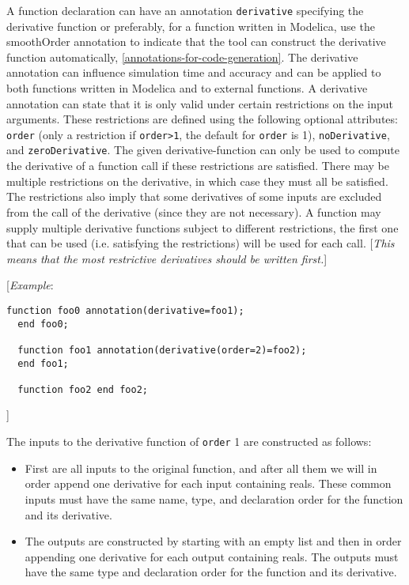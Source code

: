 A function declaration can have an annotation \lstinline!derivative! specifying the
derivative function or preferably, for a function written in Modelica,
use the smoothOrder annotation to indicate that the tool can construct
the derivative function automatically, \autoref{annotations-for-code-generation}. The derivative
annotation can influence simulation time and accuracy and can be applied
to both functions written in Modelica and to external functions. A
derivative annotation can state that it is only valid under certain
restrictions on the input arguments. These restrictions are defined
using the following optional attributes: \lstinline!order! (only a restriction if
\lstinline!order>1!, the default for \lstinline!order! is 1), \lstinline!noDerivative!, and
\lstinline!zeroDerivative!. The given derivative-function can only be used to
compute the derivative of a function call if these restrictions are
satisfied. There may be multiple restrictions on the derivative, in
which case they must all be satisfied. The restrictions also imply that
some derivatives of some inputs are excluded from the call of the
derivative (since they are not necessary). A function may supply
multiple derivative functions subject to different restrictions, the
first one that can be used (i.e. satisfying the restrictions) will be
used for each call. {[}\emph{This means that the most restrictive
derivatives should be written first.}{]}

{[}\emph{Example}:

\begin{lstlisting}[language=modelica]
  function foo0 annotation(derivative=foo1);
  end foo0;

  function foo1 annotation(derivative(order=2)=foo2);
  end foo1;

  function foo2 end foo2;
\end{lstlisting}
{]}

The inputs to the derivative function of \lstinline!order! 1 are constructed as
follows:

\begin{itemize}
\item
  First are all inputs to the original function, and after all them we
  will in order append one derivative for each input containing reals.
  These common inputs must have the same name, type, and declaration
  order for the function and its derivative.
\item
  The outputs are constructed by starting with an empty list and then in
  order appending one derivative for each output containing reals. The
  outputs must have the same type and declaration order for the function
  and its derivative.
\end{itemize}


